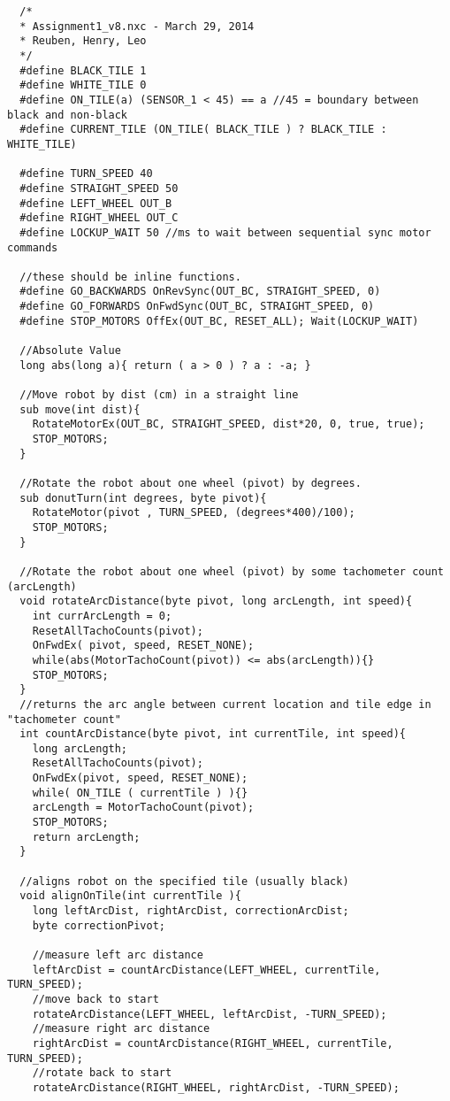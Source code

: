 \documentclass[a4paper,11pt]{article}
\begin{document}
\begin{lstlisting}
  /*
  * Assignment1_v8.nxc - March 29, 2014
  * Reuben, Henry, Leo
  */
  #define BLACK_TILE 1
  #define WHITE_TILE 0
  #define ON_TILE(a) (SENSOR_1 < 45) == a //45 = boundary between black and non-black
  #define CURRENT_TILE (ON_TILE( BLACK_TILE ) ? BLACK_TILE : WHITE_TILE)

  #define TURN_SPEED 40
  #define STRAIGHT_SPEED 50
  #define LEFT_WHEEL OUT_B
  #define RIGHT_WHEEL OUT_C
  #define LOCKUP_WAIT 50 //ms to wait between sequential sync motor commands

  //these should be inline functions.
  #define GO_BACKWARDS OnRevSync(OUT_BC, STRAIGHT_SPEED, 0)
  #define GO_FORWARDS OnFwdSync(OUT_BC, STRAIGHT_SPEED, 0)
  #define STOP_MOTORS OffEx(OUT_BC, RESET_ALL); Wait(LOCKUP_WAIT)

  //Absolute Value
  long abs(long a){ return ( a > 0 ) ? a : -a; }

  //Move robot by dist (cm) in a straight line
  sub move(int dist){
    RotateMotorEx(OUT_BC, STRAIGHT_SPEED, dist*20, 0, true, true);
    STOP_MOTORS;
  }

  //Rotate the robot about one wheel (pivot) by degrees.
  sub donutTurn(int degrees, byte pivot){
    RotateMotor(pivot , TURN_SPEED, (degrees*400)/100);
    STOP_MOTORS;
  }

  //Rotate the robot about one wheel (pivot) by some tachometer count (arcLength)
  void rotateArcDistance(byte pivot, long arcLength, int speed){
    int currArcLength = 0;
    ResetAllTachoCounts(pivot);
    OnFwdEx( pivot, speed, RESET_NONE);
    while(abs(MotorTachoCount(pivot)) <= abs(arcLength)){}
    STOP_MOTORS;
  }
  //returns the arc angle between current location and tile edge in "tachometer count"
  int countArcDistance(byte pivot, int currentTile, int speed){
    long arcLength;
    ResetAllTachoCounts(pivot);
    OnFwdEx(pivot, speed, RESET_NONE);
    while( ON_TILE ( currentTile ) ){}
    arcLength = MotorTachoCount(pivot);
    STOP_MOTORS;
    return arcLength;
  }

  //aligns robot on the specified tile (usually black)
  void alignOnTile(int currentTile ){
    long leftArcDist, rightArcDist, correctionArcDist;
    byte correctionPivot;

    //measure left arc distance
    leftArcDist = countArcDistance(LEFT_WHEEL, currentTile, TURN_SPEED);
    //move back to start
    rotateArcDistance(LEFT_WHEEL, leftArcDist, -TURN_SPEED);
    //measure right arc distance
    rightArcDist = countArcDistance(RIGHT_WHEEL, currentTile, TURN_SPEED);
    //rotate back to start
    rotateArcDistance(RIGHT_WHEEL, rightArcDist, -TURN_SPEED);


\end{lstlisting}
\end{document}
